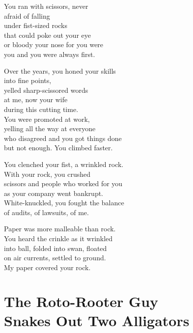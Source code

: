 \documentclass[twoside,10pt]{book}
\begin{document}
You ran with scissors, never\\
afraid of falling\\
under fist-sized rocks\\
that could poke out your eye\\
or bloody your nose for you were\\
you and you were always first.

Over the years, you honed your skills\\
into fine points,\\
yelled sharp-scissored words\\
at me, now your wife\\
during this cutting time.\\
You were promoted at work,\\
yelling all the way at everyone\\
who disagreed and you got things done\\
but not enough. You climbed faster.

You clenched your fist, a wrinkled rock.\\
With your rock, you crushed\\
scissors and people who worked for you\\
as your company went bankrupt.\\
White-knuckled, you fought the balance\\
of audits, of lawsuits, of me.

Paper was more malleable than rock.\\
You heard the crinkle as it wrinkled\\
into ball, folded into swan, floated\\
on air currents, settled to ground.\\
My paper covered your rock.


\clearpage
\section{The Roto-Rooter Guy\\
 Snakes Out Two Alligators}
\end{document}
